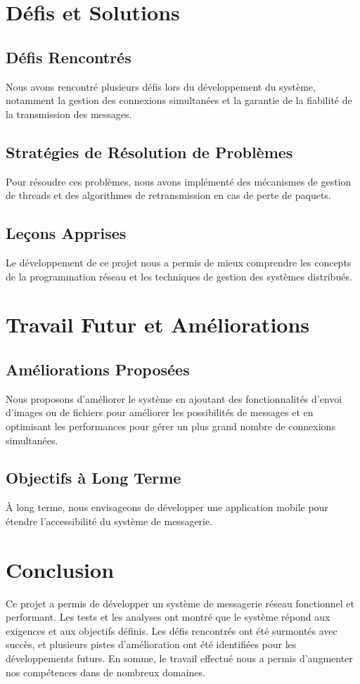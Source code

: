 \documentclass{article}
\begin{document}
\section{Défis et Solutions}
\subsection{Défis Rencontrés}
Nous avons rencontré plusieurs défis lors du développement du système, notamment la gestion des connexions simultanées et la garantie de la fiabilité de la transmission des messages.

\subsection{Stratégies de Résolution de Problèmes}
Pour résoudre ces problèmes, nous avons implémenté des mécanismes de gestion de threads et des algorithmes de retransmission en cas de perte de paquets.

\subsection{Leçons Apprises}
Le développement de ce projet nous a permis de mieux comprendre les concepts de la programmation réseau et les techniques de gestion des systèmes distribués.

\section{Travail Futur et Améliorations}
\subsection{Améliorations Proposées}
Nous proposons d'améliorer le système en ajoutant des fonctionnalités d'envoi d'images ou de fichiers pour améliorer les possibilités de messages et en optimisant les performances pour gérer un plus grand nombre de connexions simultanées.

\subsection{Objectifs à Long Terme}
À long terme, nous envisageons de développer une application mobile pour étendre l'accessibilité du système de messagerie.

\section{Conclusion}
Ce projet a permis de développer un système de messagerie réseau fonctionnel et performant. Les tests et les analyses ont montré que le système répond aux exigences et aux objectifs définis. Les défis rencontrés ont été surmontés avec succès, et plusieurs pistes d'amélioration ont été identifiées pour les développements futurs. En somme, le travail effectué nous a permis d'augmenter nos compétences dans de nombreux domaines.



\end{document}
